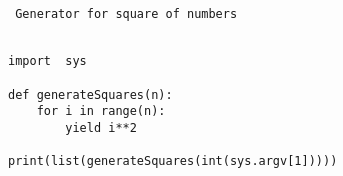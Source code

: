 \begin{center}
 \texttt{
 Generator for square of numbers
} 
 \end{center}
\begin{verbatim}

import  sys

def generateSquares(n):
	for i in range(n):
		yield i**2

print(list(generateSquares(int(sys.argv[1]))))

\end{verbatim}
